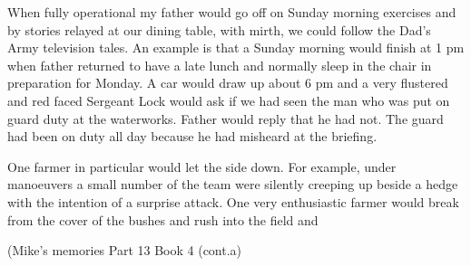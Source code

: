 When fully operational my father would go off on Sunday morning exercises and by
stories relayed at our dining table, with mirth, we could follow the Dad's Army
television tales.  An example is that a Sunday morning would finish at 1 pm
when father returned to have a late lunch and normally sleep in the chair in
preparation for Monday.  A car would draw up about 6 pm and a very flustered
and red faced Sergeant Lock would ask if we had seen the man who was put on
guard duty at the waterworks.  Father would reply that he had not.  The guard
had been on duty all day because he had misheard at the briefing.

One farmer in particular would let the side down.  For example, under manoeuvers
a small number of the team were silently creeping up beside a hedge with the
intention of a surprise attack.  One very enthusiastic farmer would break from
the cover of the bushes and rush into the field and

(Mike's memories Part 13 Book 4 (cont.a)

